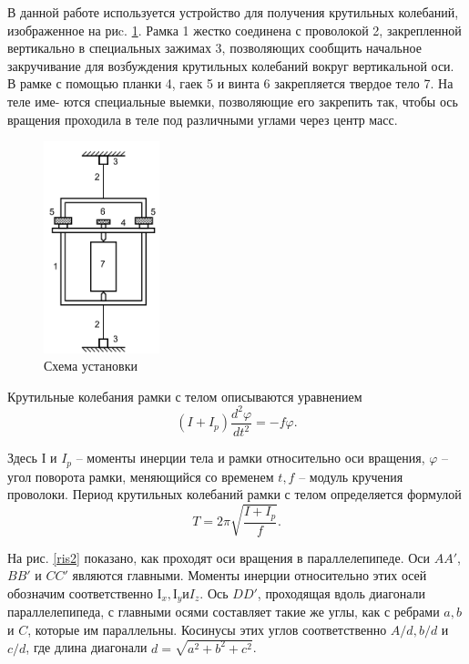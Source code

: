 	В данной работе используется устройство для получения крутильных колебаний, изображенное на риc. \ref{ris1}. Рамка 1 жестко соединена с проволокой 2, закрепленной вертикально в специальных зажимах 3, позволяющих сообщить начальное закручивание для возбуждения крутильных колебаний вокруг вертикальной оси. В рамке с помощью планки 4, гаек 5 и винта 6 закрепляется твердое тело 7. На теле име- ются специальные выемки, позволяющие его закрепить так, чтобы ось вращения проходила в теле под различными углами через центр масс.

\begin{figure}
\centering
\includegraphics[width=0.3\textwidth]{pictures/ris1.png}
\caption{\label{ris1}Схема установки}
\end{figure}

Крутильные колебания рамки с телом описываются уравнением
\begin{equation}\label{f1}
		(I + I_p)\frac{d^2\varphi}{dt^2} = -f\varphi.
	\end{equation}
 
 Здесь $І$ и $I_p$ -- моменты инерции тела и рамки относительно оси вращения, $\varphi$ -- угол поворота рамки, меняющийся со временем $t, f$ -- модуль кручения проволоки. Период крутильных колебаний рамки с телом определяется формулой
\begin{equation}\label{f2}
		T = 2\pi \sqrt{\frac{I + I_p}{f}}.
	\end{equation}
 
На рис. \ref{ris2} показано, как проходят оси вращения в параллелепипеде. Оси $AA '$, $BB '$ и $CC '$ являются главными. Моменты инерции относительно этих осей обозначим соответственно $І_x, І_y и I_z$. Ось $DD'$, проходящая вдоль диагонали параллелепипеда, с главными осями составляет такие же углы, как с ребрами $a, b$ и $C$, которые им параллельны. Косинусы этих углов соответственно $A/d, b/d$ и $c/d$, где длина диагонали $d = \sqrt{a^2+b^2+c^2}$.

